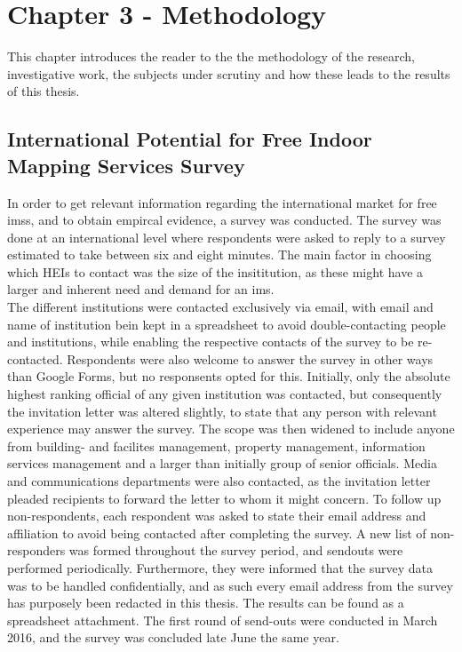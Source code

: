 \chapter{Chapter 3 - Methodology}
This chapter introduces the reader to the the methodology of the research, investigative work, the subjects under scrutiny and how these leads to the results of this thesis.

\section{International Potential for Free Indoor Mapping Services Survey}
In order to get relevant information regarding the international market for free \glspl{ims}, and to obtain empircal evidence, a survey was conducted. The survey was done at an international level where respondents were asked to reply to a survey estimated to take between six and eight minutes. The main factor in choosing which HEIs to contact was the size of the insititution, as these might have a larger and inherent need and demand for an \gls{ims}. 
\newline
\\
The different institutions were contacted exclusively via email, with email and name of institution bein kept in a spreadsheet to avoid double-contacting people and institutions, while enabling the respective contacts of the survey to be re-contacted. Respondents were also welcome to answer the survey in other ways than Google Forms, but no responsents opted for this. Initially, only the absolute highest ranking official of any given institution was contacted, but consequently the invitation letter was altered slightly, to state that any person with relevant experience may answer the survey. The scope was then widened to include anyone from building- and facilites management, property management, information services management and a larger than initially group of senior officials. Media and communications departments were also contacted, as the invitation letter pleaded recipients to forward the letter to whom it might concern. To follow up non-respondents, each respondent was asked to state their email address and affiliation to avoid being contacted after completing the survey. A new list of non-responders was formed throughout the survey period, and sendouts were performed periodically. Furthermore, they were informed that the survey data was to be handled confidentially, and as such every email address from the survey has purposely been redacted in this thesis. The results can be found as a spreadsheet attachment. The first round of send-outs were conducted in March 2016, and the survey was concluded late June the same year. 

